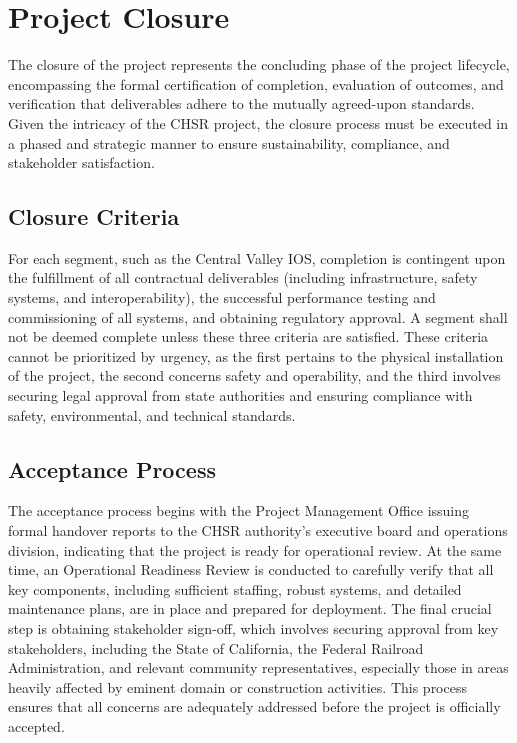 \chapter{Project Closure}

The closure of the project represents the concluding phase of the project lifecycle, encompassing the formal certification of completion, evaluation of outcomes, and verification that deliverables adhere to the mutually agreed-upon standards. Given the intricacy of the CHSR project, the closure process must be executed in a phased and strategic manner to ensure sustainability, compliance, and stakeholder satisfaction.

\section{Closure Criteria}
For each segment, such as the Central Valley IOS, completion is contingent upon the fulfillment of all contractual deliverables (including infrastructure, safety systems, and interoperability), the successful performance testing and commissioning of all systems, and obtaining regulatory approval. A segment shall not be deemed complete unless these three criteria are satisfied. These criteria cannot be prioritized by urgency, as the first pertains to the physical installation of the project, the second concerns safety and operability, and the third involves securing legal approval from state authorities and ensuring compliance with safety, environmental, and technical standards. \par

\section{Acceptance Process}
The acceptance process begins with the Project Management Office issuing formal handover reports to the CHSR authority’s executive board and operations division, indicating that the project is ready for operational review. At the same time, an Operational Readiness Review is conducted to carefully verify that all key components, including sufficient staffing, robust systems, and detailed maintenance plans, are in place and prepared for deployment. The final crucial step is obtaining stakeholder sign-off, which involves securing approval from key stakeholders, including the State of California, the Federal Railroad Administration, and relevant community representatives, especially those in areas heavily affected by eminent domain or construction activities. This process ensures that all concerns are adequately addressed before the project is officially accepted.

